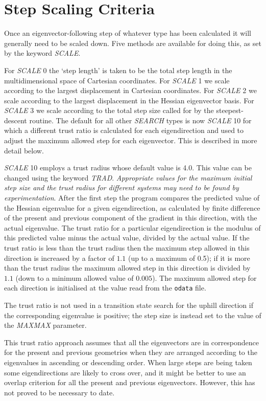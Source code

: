 \documentclass[12pt,a4paper,dvips]{article}
\begin{document}
\section{Step Scaling Criteria}
\label{sec:scaling}
Once an eigenvector-following step of whatever
type has been calculated it will generally need to be scaled down. Five methods
are available for doing this, as set by the keyword {\it SCALE\/}. 

For {\it SCALE\/} 0 the `step length' is taken to be the total step length in the multidimensional
space of Cartesian coordinates. For {\it SCALE\/} 1 we scale according to the largest displacement
in Cartesian coordinates. For {\it SCALE\/} 2 we scale according to the largest displacement
in the Hessian eigenvector basis. For {\it SCALE\/} 3 we scale according to the total step size
called for by the steepest-descent routine. The default for all other {\it SEARCH\/} types is now
{\it SCALE\/} 10 for which a different trust ratio is calculated for each eigendirection and used 
to adjust the maximum allowed step for each eigenvector. This
is described in more detail below.\cite{walesw96}

{\it SCALE\/} 10 employs a trust radius whose default value is 4.0. This value can be changed
using the keyword {\it TRAD\/}.
{\it Appropriate values for the maximum initial step size and the trust radius
for different systems may need to be found by experimentation\/}. After the first step the
program compares the predicted value of the Hessian eigenvalue for a given eigendirection,
as calculated by finite difference of the present and previous component of the gradient in
this direction, with the actual eigenvalue. The trust ratio for a particular eigendirection
is the modulus of this predicted value minus the actual value, divided by the actual value. 
If the trust ratio is less than the trust radius then the maximum step allowed in this
direction is increased by a factor of $1.1$ (up to a maximum of 0.5); if it is more
than the trust radius the maximum allowed step in this direction is divided by $1.1$ (down
to a minimum allowed value of $0.005$). The maximum allowed step for each direction is
initialised at the value read from the {\tt odata} file. 

The trust ratio is not used in a transition state search for the uphill direction if the 
corresponding eigenvalue is positive; the step size is instead set to the value
of the {\it MAXMAX\/} parameter.

This trust ratio approach assumes that all the eigenvectors are in correspondence for the present and
previous geometries when they are arranged according to the eigenvalues in ascending or
descending order. When large steps are being taken some eigendirections are likely to cross
over, and it might be better to use an overlap criterion for all the present and previous
eigenvectors. However, this has not proved to be necessary to date.
\end{document}
